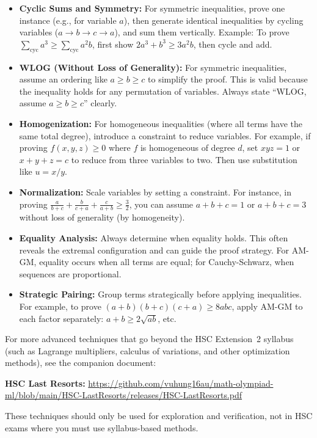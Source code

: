 \documentclass[12pt]{article}
\newenvironment{remark}[1][]{%
  \begin{remarkbox}[title={\bfseries Remark~\thetcbcounter\ifx\relax#1\relax\else\ (#1)\fi}]%
}{%
  \end{remarkbox}%
}
\begin{document}
\begin{itemize}[leftmargin=*]
\item \textbf{Cyclic Sums and Symmetry:} For symmetric inequalities, prove one instance (e.g., for variable $a$), then generate identical inequalities by cycling variables ($a \to b \to c \to a$), and sum them vertically. Example: To prove $\sum_{\text{cyc}} a^3 \ge \sum_{\text{cyc}} a^2b$, first show $2a^3 + b^3 \ge 3a^2b$, then cycle and add.

\item \textbf{WLOG (Without Loss of Generality):} For symmetric inequalities, assume an ordering like $a \ge b \ge c$ to simplify the proof. This is valid because the inequality holds for any permutation of variables. Always state ``WLOG, assume $a \ge b \ge c$'' clearly.

\item \textbf{Homogenization:} For homogeneous inequalities (where all terms have the same total degree), introduce a constraint to reduce variables. For example, if proving $f(x,y,z) \ge 0$ where $f$ is homogeneous of degree $d$, set $xyz = 1$ or $x+y+z = c$ to reduce from three variables to two. Then use substitution like $u = x/y$.

\item \textbf{Normalization:} Scale variables by setting a constraint. For instance, in proving $\frac{a}{b+c} + \frac{b}{c+a} + \frac{c}{a+b} \ge \frac{3}{2}$, you can assume $a+b+c=1$ or $a+b+c=3$ without loss of generality (by homogeneity).

\item \textbf{Equality Analysis:} Always determine when equality holds. This often reveals the extremal configuration and can guide the proof strategy. For AM-GM, equality occurs when all terms are equal; for Cauchy-Schwarz, when sequences are proportional.

\item \textbf{Strategic Pairing:} Group terms strategically before applying inequalities. For example, to prove $(a+b)(b+c)(c+a) \ge 8abc$, apply AM-GM to each factor separately: $a+b \ge 2\sqrt{ab}$, etc.
\end{itemize}

\begin{remark}[Advanced Techniques Beyond Syllabus]
For more advanced techniques that go beyond the HSC Extension~2 syllabus (such as Lagrange multipliers, calculus of variations, and other optimization methods), see the companion document:

\vspace{0.5em}
\noindent\textbf{HSC Last Resorts:} {\small\href{https://github.com/vuhung16au/math-olympiad-ml/blob/main/HSC-LastResorts/releases/HSC-LastResorts.pdf}{https://github.com/vuhung16au/math-olympiad-ml/blob/main/HSC-LastResorts/releases/HSC-LastResorts.pdf}}

\vspace{0.5em}
\noindent These techniques should only be used for exploration and verification, not in HSC exams where you must use syllabus-based methods.
\end{remark}
\end{document}
